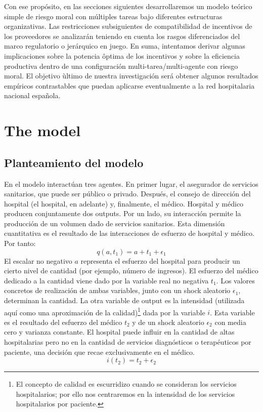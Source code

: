 ﻿\documentclass[12pt,letterpaper]{article}
\begin{document}
Con ese prop\'osito, en las secciones siguientes desarrollaremos un modelo te\'orico simple de riesgo moral con m\'ultiples tareas bajo diferentes estructuras organizativas. Las restricciones subsiguientes de compatibilidad de incentivos de los proveedores se analizar\'an teniendo en cuenta los rasgos diferenciados del marco regulatorio o jer\'arquico en juego. En suma, intentamos derivar algunas implicaciones sobre la potencia \^optima de los incentivos y sobre la eficiencia productiva dentro de una configuraci\'on multi-tarea/multi-agente con riesgo moral. El objetivo \`ultimo de nuestra investigaci\'on ser\'a obtener algunos resultados emp\'iricos contrastables que puedan aplicarse eventualmente a la red hospitalaria nacional espa\~nola.

\section{The model}

\subsection{Planteamiento del modelo}
En el modelo interact\'uan tres agentes. En primer lugar, el asegurador de servicios sanitarios, que puede ser p\'ublico o privado. Despu\'es, el consejo de direcci\'on del hospital (el hospital, en adelante) y, finalmente, el m\'edico. Hospital y m\'edico producen conjuntamente dos outputs. Por un lado, su interacci\'on permite la producci\'on de un volumen dado de servicios sanitarios. Esta dimensi\'on cuantitativa es el resultado de las interacciones de esfuerzo de hospital y m\'edico. Por tanto:
\begin{equation*}\label{eq:q}
  q(a,t_1)=a+t_1+\epsilon_1
\end{equation*}
El escalar no negativo $a$ representa el esfuerzo del hospital para producir un cierto nivel de cantidad (por ejemplo, n\'umero de ingresos). El esfuerzo del m\'edico dedicado a la cantidad viene dado por la variable real no negativa $t_1$. Los valores concretos de realizaci\'on de ambas variables, junto con un shock aleatorio $\epsilon_1$, determinan la cantidad.
La otra variable de output es la intensidad (utilizada aqu\'i como una aproximaci\'on de la calidad)\footnote{El concepto de calidad es escurridizo cuando se consideran los servicios hospitalarios; por ello nos centraremos en la intensidad de los servicios hospitalarios por paciente.} dada por la variable $i$. Esta variable es el resultado del esfuerzo del m\'edico $t_2$ y de un shock aleatorio $\epsilon_2$ con media cero y varianza constante. El hospital puede influir en la cantidad de altas hospitalarias pero no en la cantidad de servicios diagn\'osticos o terap\'euticos por paciente, una decisi\'on que recae exclusivamente en el m\'edico.
\begin{equation*}\label{eq:i}
  i(t_2)=t_2+\epsilon_2
\end{equation*}
\end{document}
